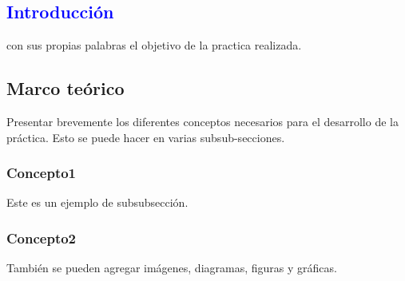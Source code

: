 \textcolor{blue}{\section{Introducción}}
 con sus propias palabras el objetivo de la practica realizada.

\subsection{Marco teórico}
Presentar brevemente los diferentes conceptos necesarios para el desarrollo de la práctica. Esto se puede hacer en varias subsub-secciones.

\subsubsection{Concepto1}
Este es un ejemplo de subsubsección.

\subsubsection{Concepto2}
También se pueden agregar imágenes, diagramas, figuras y gráficas.